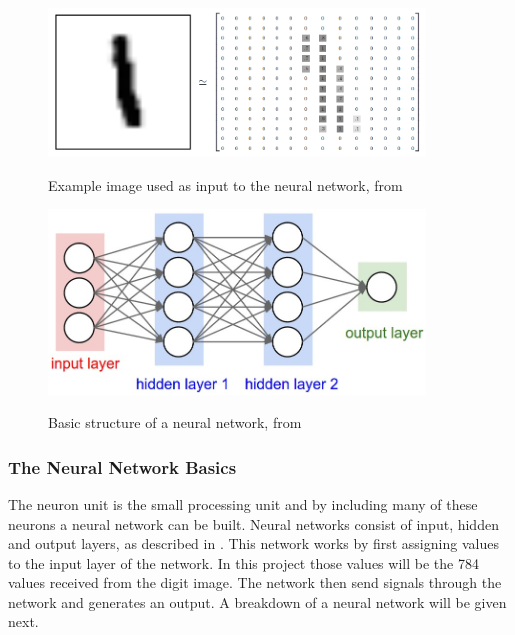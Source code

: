 \begin{figure}
  \centering
  \includegraphics[width=10cm]{MNIST}\\
  \caption{Example image used as input to the neural network, from \citet{tensor2017}}
  \label{fig:mnist}
\end{figure}

\begin{figure}
  \centering
  \includegraphics[width=10cm]{NN}\\
  \caption{Basic structure of a neural network, from \citet{karpathy2017}}%
  \label{fig:nn}
\end{figure}

\subsubsection{The Neural Network Basics}

The neuron unit is the small processing unit and by including many of these neurons a neural network can be built. Neural networks consist of input, hidden and output layers, as described in \citet{MichealN2015}. This network works by first assigning values to the input layer of the network. In this project those values will be the 784 values received from the digit image. The network then send signals through the network and generates an output. A breakdown of a neural network will be given next.

